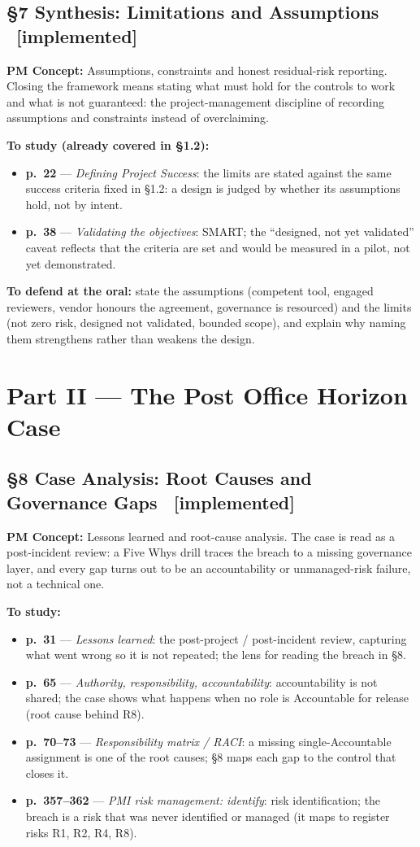 \documentclass[12pt,a4paper]{article}
\newcommand{\statusdone}{\textcolor{donegreen}{\small\textbf{[implemented]}}}
\newcommand{\slide}[3]{\item \textbf{p.~#1} --- \textit{#2}: #3}
\newcommand{\concetto}[1]{\textbf{PM Concept:} #1\par\vspace{2pt}}
\begin{document}
\subsection{\S7 Synthesis: Limitations and Assumptions \ \statusdone}
\concetto{Assumptions, constraints and honest residual-risk reporting. Closing the framework means stating what must hold for the controls to work and what is not guaranteed: the project-management discipline of recording assumptions and constraints instead of overclaiming.}
\textbf{To study (already covered in \S1.2):}
\begin{itemize}
  \slide{22}{Defining Project Success}{the limits are stated against the same success criteria fixed in \S1.2: a design is judged by whether its assumptions hold, not by intent.}
  \slide{38}{Validating the objectives}{SMART; the ``designed, not yet validated'' caveat reflects that the criteria are set and would be measured in a pilot, not yet demonstrated.}
\end{itemize}
\textbf{To defend at the oral:} state the assumptions (competent tool, engaged reviewers, vendor honours the agreement, governance is resourced) and the limits (not zero risk, designed not validated, bounded scope), and explain why naming them strengthens rather than weakens the design.

\section{Part II --- The Post Office Horizon Case}

\subsection{\S8 Case Analysis: Root Causes and Governance Gaps \ \statusdone}
\concetto{Lessons learned and root-cause analysis. The case is read as a post-incident review: a Five Whys drill traces the breach to a missing governance layer, and every gap turns out to be an accountability or unmanaged-risk failure, not a technical one.}
\textbf{To study:}
\begin{itemize}
  \slide{31}{Lessons learned}{the post-project / post-incident review, capturing what went wrong so it is not repeated; the lens for reading the breach in \S8.}
  \slide{65}{Authority, responsibility, accountability}{accountability is not shared; the case shows what happens when no role is Accountable for release (root cause behind R8).}
  \slide{70--73}{Responsibility matrix / RACI}{a missing single-Accountable assignment is one of the root causes; \S8 maps each gap to the control that closes it.}
  \slide{357--362}{PMI risk management: identify}{risk identification; the breach is a risk that was never identified or managed (it maps to register risks R1, R2, R4, R8).}
\end{itemize}
\end{document}
